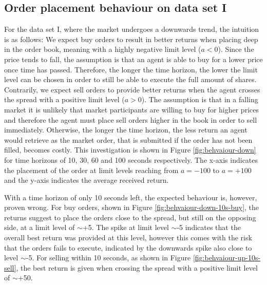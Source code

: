 \subsection{Order placement behaviour on data set I}
For the data set I, where the market undergoes a downwards trend, the intuition is as follows:
We expect buy orders to result in better returns when placing deep in the order book, meaning with a highly negative limit level ($a<0$).
Since the price tends to fall, the assumption is that an agent is able to buy for a lower price once time has passed.
Therefore, the longer the time horizon, the lower the limit level can be chosen in order to still be able to execute the full amount of shares.
Contrarily, we expect sell orders to provide better returns when the agent crosses the spread with a positive limit level ($a>0$).
The assumption is that in a falling market it is unlikely that market participants are willing to buy for higher prices and therefore the agent must place sell orders higher in the book in order to sell immediately.
Otherwise, the longer the time horizon, the less return an agent would retrieve as the market order, that is submitted if the order has not been filled, becomes costly.
This investigation is shown in Figure \ref{fig:behvaiour-down} for time horizons of 10, 30, 60 and 100 seconds respectively.
The x-axis indicates the placement of the order at limit levels reaching from $a=-100$ to $a=+100$ and the y-axis indicates the average received return.

With a time horizon of only 10 seconds left, the expected behaviour is, however, proven wrong.
For buy orders, shown in Figure \ref{fig:behvaiour-down-10s-buy}, the returns suggest to place the orders close to the spread, but still on the opposing side, at a limit level of $\sim$+5.
The spike at limit level $\sim$-5 indicates that the overall best return was provided at this level, however this comes with the risk that the orders fails to execute, indicated by the downwards spike also close to level $\sim$-5.
For selling within 10 seconds, as shown in Figure \ref{fig:behvaiour-up-10s-sell}, the best return is given when crossing the spread with a positive limit level of $\sim$+50.


